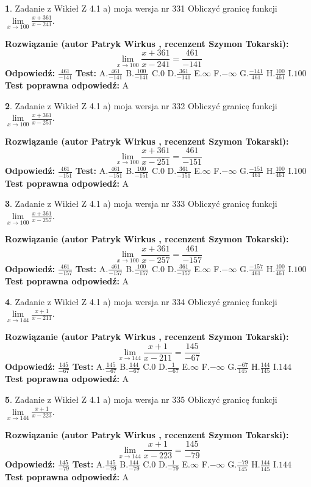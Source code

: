 \documentclass[12pt, a4paper]{article}
\theoremstyle{definition} %
\newtheorem{zad}{}
\newcommand{\zadStart}[1]{\begin{zad}#1\newline}
\newcommand{\zadStop}{\end{zad}}
\newcommand{\rozwStart}[2]{\noindent \textbf{Rozwiązanie (autor #1 , recenzent #2): }\newline}
\newcommand{\rozwStop}{\newline}
\newcommand{\odpStart}{\noindent \textbf{Odpowiedź:}\newline}
\newcommand{\odpStop}{\newline}
\newcommand{\testStart}{\noindent \textbf{Test:}\newline}
\newcommand{\testStop}{\newline}
\newcommand{\kluczStart}{\noindent \textbf{Test poprawna odpowiedź:}\newline}
\newcommand{\kluczStop}{\newline}
\begin{document}
\zadStart{Zadanie z Wikieł Z 4.1 a) moja wersja nr 331}
Obliczyć granicę funkcji $\lim\limits_{x\to100}\frac{x+361}{x-241}$.
\zadStop
\rozwStart{Patryk Wirkus}{Szymon Tokarski}
$$\lim\limits_{x\to100}\frac{x+361}{x-241} = \frac{461}{-141}$$
\rozwStop
\odpStart
$\frac{461}{-141}$
\odpStop
\testStart
A.$\frac{461}{-141}$
B.$\frac{100}{-141}$
C.$0$
D.$\frac{361}{-141}$
E.$\infty$
F.$-\infty$
G.$\frac{-141}{461}$
H.$\frac{100}{461}$
I.$100$
\testStop
\kluczStart
A
\kluczStop



\zadStart{Zadanie z Wikieł Z 4.1 a) moja wersja nr 332}
Obliczyć granicę funkcji $\lim\limits_{x\to100}\frac{x+361}{x-251}$.
\zadStop
\rozwStart{Patryk Wirkus}{Szymon Tokarski}
$$\lim\limits_{x\to100}\frac{x+361}{x-251} = \frac{461}{-151}$$
\rozwStop
\odpStart
$\frac{461}{-151}$
\odpStop
\testStart
A.$\frac{461}{-151}$
B.$\frac{100}{-151}$
C.$0$
D.$\frac{361}{-151}$
E.$\infty$
F.$-\infty$
G.$\frac{-151}{461}$
H.$\frac{100}{461}$
I.$100$
\testStop
\kluczStart
A
\kluczStop



\zadStart{Zadanie z Wikieł Z 4.1 a) moja wersja nr 333}
Obliczyć granicę funkcji $\lim\limits_{x\to100}\frac{x+361}{x-257}$.
\zadStop
\rozwStart{Patryk Wirkus}{Szymon Tokarski}
$$\lim\limits_{x\to100}\frac{x+361}{x-257} = \frac{461}{-157}$$
\rozwStop
\odpStart
$\frac{461}{-157}$
\odpStop
\testStart
A.$\frac{461}{-157}$
B.$\frac{100}{-157}$
C.$0$
D.$\frac{361}{-157}$
E.$\infty$
F.$-\infty$
G.$\frac{-157}{461}$
H.$\frac{100}{461}$
I.$100$
\testStop
\kluczStart
A
\kluczStop



\zadStart{Zadanie z Wikieł Z 4.1 a) moja wersja nr 334}
Obliczyć granicę funkcji $\lim\limits_{x\to144}\frac{x+1}{x-211}$.
\zadStop
\rozwStart{Patryk Wirkus}{Szymon Tokarski}
$$\lim\limits_{x\to144}\frac{x+1}{x-211} = \frac{145}{-67}$$
\rozwStop
\odpStart
$\frac{145}{-67}$
\odpStop
\testStart
A.$\frac{145}{-67}$
B.$\frac{144}{-67}$
C.$0$
D.$\frac{1}{-67}$
E.$\infty$
F.$-\infty$
G.$\frac{-67}{145}$
H.$\frac{144}{145}$
I.$144$
\testStop
\kluczStart
A
\kluczStop



\zadStart{Zadanie z Wikieł Z 4.1 a) moja wersja nr 335}
Obliczyć granicę funkcji $\lim\limits_{x\to144}\frac{x+1}{x-223}$.
\zadStop
\rozwStart{Patryk Wirkus}{Szymon Tokarski}
$$\lim\limits_{x\to144}\frac{x+1}{x-223} = \frac{145}{-79}$$
\rozwStop
\odpStart
$\frac{145}{-79}$
\odpStop
\testStart
A.$\frac{145}{-79}$
B.$\frac{144}{-79}$
C.$0$
D.$\frac{1}{-79}$
E.$\infty$
F.$-\infty$
G.$\frac{-79}{145}$
H.$\frac{144}{145}$
I.$144$
\testStop
\kluczStart
A
\kluczStop
\end{document}
